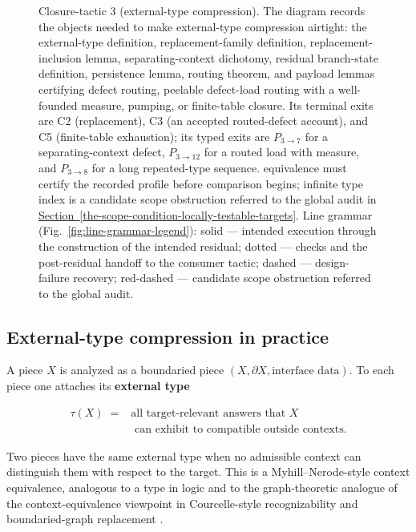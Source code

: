 \documentclass[
  11pt,
]{article}
\theoremstyle{definition}
\newcommand{\secref}[1]{\hyperref[#1]{Section~\ref*{#1}}}
\begin{document}
\begin{figure}[p]
{%
}
\caption[Closure-tactic 3: external-type compression]{Closure-tactic 3 (external-type compression).  The diagram records the objects needed to make external-type compression airtight: the external-type definition, replacement-family definition, replacement-inclusion lemma, separating-context dichotomy, residual branch-state definition, persistence lemma, routing theorem, and payload lemmas certifying defect routing, peelable defect-load routing with a well-founded measure, pumping, or finite-table closure.  Its terminal exits are C2 (replacement), C3 (an accepted routed-defect account), and C5 (finite-table exhaustion); its typed exits are \(P_{3\to7}\) for a separating-context defect, \(P_{3\to12}\) for a routed load with measure, and \(P_{3\to8}\) for a long repeated-type sequence.  equivalence must certify the recorded profile before comparison begins; infinite type index is a candidate scope obstruction referred to the global audit in \secref{the-scope-condition-locally-testable-targets}.  Line grammar (Fig.~\ref{fig:line-grammar-legend}): solid --- intended execution through the construction of the intended residual; dotted --- checks and the post-residual handoff to the consumer tactic; dashed --- design-failure recovery; red-dashed --- candidate scope obstruction referred to the global audit.}
\label{fig:ct3-external-type-compression}
\end{figure}
\FloatBarrier

\subsection*{External-type compression in practice}

A piece \(X\) is analyzed as a boundaried piece
\((X,\partial X,\text{interface data})\). To each piece one attaches its
\textbf{external type}

\[
\begin{aligned}
\tau(X) \;={}& \text{all target-relevant answers that } X\\
&\text{ can exhibit to compatible outside contexts}.
\end{aligned}
\]

Two pieces have the same external type when no admissible context can
distinguish them with respect to the target. This is a Myhill--Nerode-style
context equivalence, analogous to a type in logic and to the
graph-theoretic analogue of the context-equivalence viewpoint in
Courcelle-style recognizability and boundaried-graph replacement
\citep{myhill-1957-automata, nerode-1958-linear, courcelle-1990-mso-graphs, courcelle-engelfriet-2012-graph-structure, bodlaender-etal-2009-meta-kernelization}.
\end{document}
